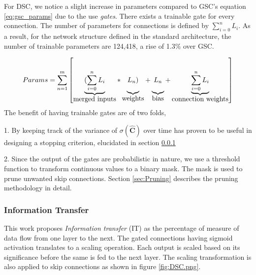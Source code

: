 \documentclass{article}
\let\oldhat\hat
\renewcommand{\hat}[1]{\oldhat{\mathbf{#1}}}
\begin{document}
For DSC, we notice a slight increase in parameters compared to GSC's equation \ref{eq:gsc_params} due to the use \emph{gates}. There exists a trainable gate for every connection. The number of parameters for connections is defined by $\sum_{i=0}^{n}L_{i}$. As a result, for the network structure defined in the standard architecture, the number of trainable parameters are 124,418, a rise of 1.3\% over GSC.

\begin{equation}
\label{eq:dsc_params}
Params= \sum_{n=1}^{m}\left[
\underbrace{(\sum_{i=0}^{n}L_{i}\rule[-12pt]{0pt}{5pt}}_{\mbox{merged inputs}}
*\underbrace{L_{n})\rule[-12pt]{0pt}{5pt}}_{\mbox{weights}}
+\underbrace{L_{n}\rule[-12pt]{0pt}{5pt}}_{\mbox{bias}}
+\underbrace{\sum_{i=0}^{n}L_{i}\rule[-12pt]{0pt}{5pt}}_{\mbox{connection weights}}\right]
\end{equation}
The benefit of having trainable gates are of two folds,

1. By keeping track of the variance of $\sigma{(\hat{C})}$ over time has proven to be useful in designing a stopping criterion, elucidated in section \ref{sub:InfoTransfer}

2. Since the output of the gates are probabilistic in nature, we use a threshold function to transform continuous values to a binary mask. The mask is used to prune unwanted skip connections. Section \ref{sec:Pruning} describes the pruning methodology in detail.




\subsubsection{Information Transfer}
\label{sub:InfoTransfer}
This work proposes \emph{Information transfer} (IT) as the percentage of measure of data flow from one layer to the next. The gated connections having sigmoid activation translates to a scaling operation. Each output is scaled based on its significance before the same is fed to the next layer. The scaling transformation is also applied to skip connections as shown in figure \ref{fig:DSC.png}.
\end{document}
